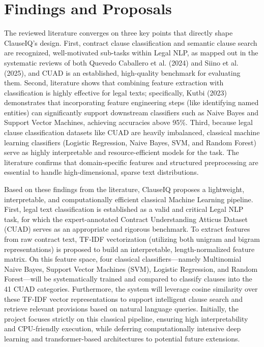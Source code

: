 \documentclass[12pt, a4paper]{report}
\begin{document}
\section{Findings and Proposals}
\label{sec:findings_and_proposals}
The reviewed literature converges on three key points that directly shape ClauseIQ's design. First, contract clause classification and semantic clause search are recognized, well-motivated sub-tasks within Legal NLP, as mapped out in the systematic reviews of both Quevedo Caballero et al. (2024) and Siino et al. (2025), and CUAD is an established, high-quality benchmark for evaluating them. Second, literature shows that combining feature extraction with classification is highly effective for legal texts; specifically, Kutbi (2023) demonstrates that incorporating feature engineering steps (like identifying named entities) can significantly support downstream classifiers such as Naive Bayes and Support Vector Machines, achieving accuracies above 95\%. Third, because legal clause classification datasets like CUAD are heavily imbalanced, classical machine learning classifiers (Logistic Regression, Naive Bayes, SVM, and Random Forest) serve as highly interpretable and resource-efficient models for the task. The literature confirms that domain-specific features and structured preprocessing are essential to handle high-dimensional, sparse text distributions.

Based on these findings from the literature, ClauseIQ proposes a lightweight, interpretable, and computationally efficient classical Machine Learning pipeline. First, legal text classification is established as a valid and critical Legal NLP task, for which the expert-annotated Contract Understanding Atticus Dataset (CUAD) serves as an appropriate and rigorous benchmark. To extract features from raw contract text, TF-IDF vectorization (utilizing both unigram and bigram representations) is proposed to build an interpretable, length-normalized feature matrix. On this feature space, four classical classifiers---namely Multinomial Naive Bayes, Support Vector Machines (SVM), Logistic Regression, and Random Forest---will be systematically trained and compared to classify clauses into the 41 CUAD categories. Furthermore, the system will leverage cosine similarity over these TF-IDF vector representations to support intelligent clause search and retrieve relevant provisions based on natural language queries. Initially, the project focuses strictly on this classical pipeline, ensuring high interpretability and CPU-friendly execution, while deferring computationally intensive deep learning and transformer-based architectures to potential future extensions.
\end{document}

